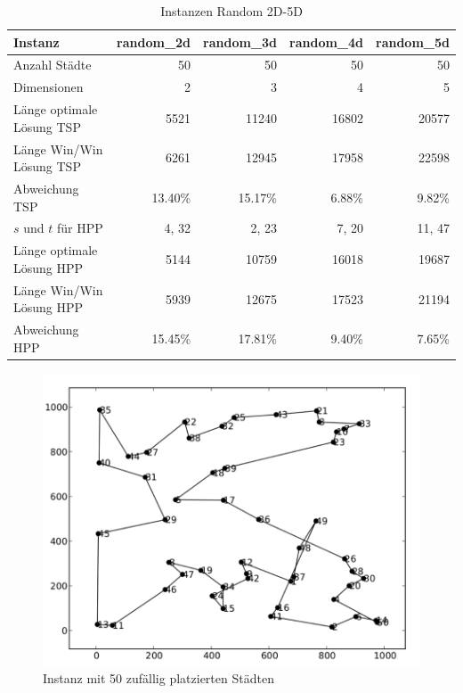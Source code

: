 \documentclass[11pt,a4paper]{article}
\begin{document}
\begin{table}[H]
        \centering
        \begin{tabular}{| l | r | r | r | r |}
            \hline
            Instanz                     & \textbf{random\_2d}
                                        & \textbf{random\_3d}
                                        & \textbf{random\_4d}
                                        & \textbf{random\_5d} \\ \hline
            Anzahl Städte               & 50        & 50        & 50        & 50            \\ \hline
            Dimensionen                 & 2         & 3         & 4         & 5       \\ \hline
            Länge optimale Lösung TSP   & 5521      & 11240     & 16802     & 20577   \\ \hline
            Länge Win/Win Lösung  TSP   & 6261      & 12945     & 17958     & 22598   \\ \hline
            Abweichung TSP              & 13.40\%   & 15.17\%   & 6.88\%    & 9.82\%  \\ \hline
            $s$ und $t$ für HPP         & 4, 32     & 2, 23     & 7, 20     & 11, 47  \\ \hline
            Länge optimale Lösung HPP   & 5144      & 10759     & 16018     & 19687   \\ \hline
            Länge Win/Win Lösung  HPP   & 5939      & 12675     & 17523     & 21194   \\ \hline
            Abweichung HPP              & 15.45\%   & 17.81\%   & 9.40\%    & 7.65\%  \\ \hline
        \end{tabular}
        \caption{Instanzen Random 2D-5D}
        \label{tab:instanzen_random}
\end{table}

\begin{figure}[H]
        \centering
        \includegraphics[width=14cm]{gfx/random_algorithm}
        \caption{Instanz mit 50 zufällig platzierten Städten}
        \label{img:random_algorithm}
\end{figure}
\end{document}
